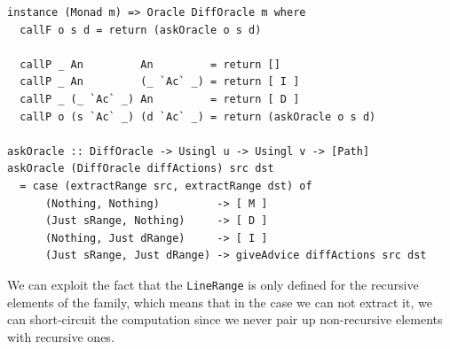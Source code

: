\documentclass[11pt, titlepage]{article}
\newcommand{\toHaskell}[1]{\texttt{#1}\xspace}
\begin{document}
\begin{verbatim}
instance (Monad m) => Oracle DiffOracle m where
  callF o s d = return (askOracle o s d)

  callP _ An         An         = return []
  callP _ An         (_ `Ac` _) = return [ I ]
  callP _ (_ `Ac` _) An         = return [ D ]
  callP o (s `Ac` _) (d `Ac` _) = return (askOracle o s d)

askOracle :: DiffOracle -> Usingl u -> Usingl v -> [Path]
askOracle (DiffOracle diffActions) src dst 
  = case (extractRange src, extractRange dst) of
      (Nothing, Nothing)         -> [ M ]
      (Just sRange, Nothing)     -> [ D ]
      (Nothing, Just dRange)     -> [ I ]
      (Just sRange, Just dRange) -> giveAdvice diffActions src dst
\end{verbatim}

We can exploit the fact that the \toHaskell{LineRange} is only defined for the recursive elements of the family, which means that in the case we can not extract it, we can short-circuit the computation since we never pair up non-recursive elements with recursive ones.
\end{document}
